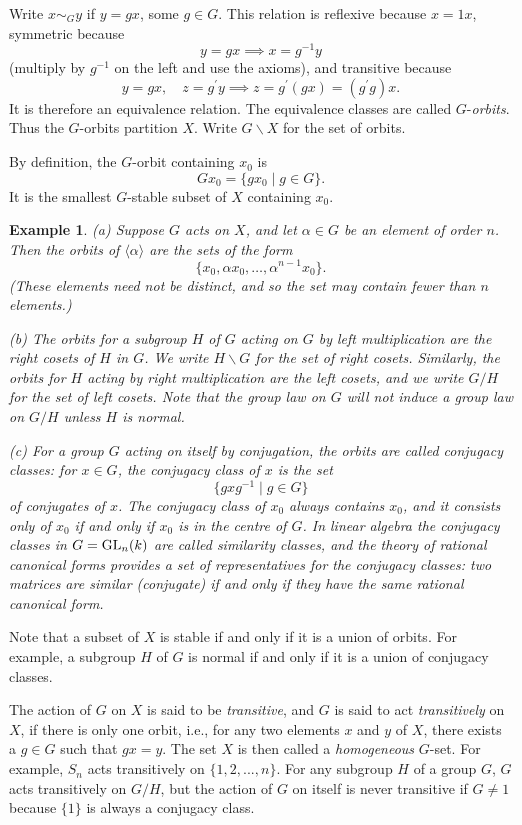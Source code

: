 \documentclass[a4paper,11pt,final]{memoir}%
\newtheorem{example}[X]{Example}
\theoremstyle{nonumberplain}
\begin{document}
Write $x\sim_{G}y$ if $y=gx$, some $g\in G$. This relation is reflexive
because $x=1x$, symmetric because
\[
y=gx\implies x=g^{-1}y
\]
(multiply by $g^{-1}$ on the left and use the axioms), and transitive because
\[
y=gx,\quad z=g^{\prime}y\implies z=g^{\prime}(gx)=(g^{\prime}g)x.
\]
It is therefore an equivalence relation. The equivalence classes are called
$G$-\emph{orbits}.%
Thus the $G$-orbits partition $X$. Write $G\backslash X$ for the set of orbits.

By definition, the $G$-orbit containing $x_{0}$ is
\[
Gx_{0}=\{gx_{0}\mid g\in G\}.
\]
It is the smallest $G$-stable subset of $X$ containing $x_{0}$.

\begin{example}
\label{ga03} (a) Suppose $G$ acts on $X$, and let $\alpha\in G$ be an element
of order $n$. Then the orbits of $\langle\alpha\rangle$ are the sets of the
form
\[
\{x_{0},\alpha x_{0},\ldots,\alpha^{n-1}x_{0}\}.
\]
(These elements need not be distinct, and so the set may contain fewer than
$n$ elements.)

(b) The orbits for a subgroup $H$ of $G$ acting on $G$ by left multiplication
are the right cosets of $H$ in $G$. We write $H\backslash G$ for the set of
right cosets. Similarly, the orbits for $H$ acting by right multiplication are
the left cosets, and we write $G/H$ for the set of left cosets. Note that the
group law on $G$ will \textit{not\/} induce a group law on $G/H$ unless $H$ is normal.

(c) For a group $G$ acting on itself by conjugation, the orbits are called
\emph{conjugacy classes:\/}%
for $x\in G$, the conjugacy class of $x$ is the set
\[
\{gxg^{-1}\mid g\in G\}
\]
of conjugates of $x$. The conjugacy class of $x_{0}$ always contains $x_{0}$,
and it consists only of $x_{0}$ if and only if $x_{0}$ is in the centre of
$G$. In linear algebra the conjugacy classes in $G=\operatorname{GL}_{n}(k)$ are called
similarity classes, and the theory of rational canonical forms provides a set
of representatives for the conjugacy classes: two matrices are similar
(conjugate) if and only if they have the same rational canonical form.
\end{example}

Note that a subset of $X$ is stable if and only if it is a union of orbits.
For example, a subgroup $H$ of $G$ is normal if and only if it is a union of
conjugacy classes.

The action of $G$ on $X$ is said to be \emph{transitive}, and $G$ is said to
act \emph{transitively\/}%
on $X$, if there is only one orbit, i.e., for any two elements $x$ and $y$ of
$X$, there exists a $g\in G$ such that $gx=y$. The set $X$ is then called a
\emph{homogeneous}%
$G$-set. For example, $S_{n}$ acts transitively on $\{1,2,...,n\}$. For any
subgroup $H$ of a group $G$, $G$ acts transitively on $G/H$, but the action of
$G$ on itself is never transitive if $G\neq1$ because $\{1\}$ is always a
conjugacy class.
\end{document}
